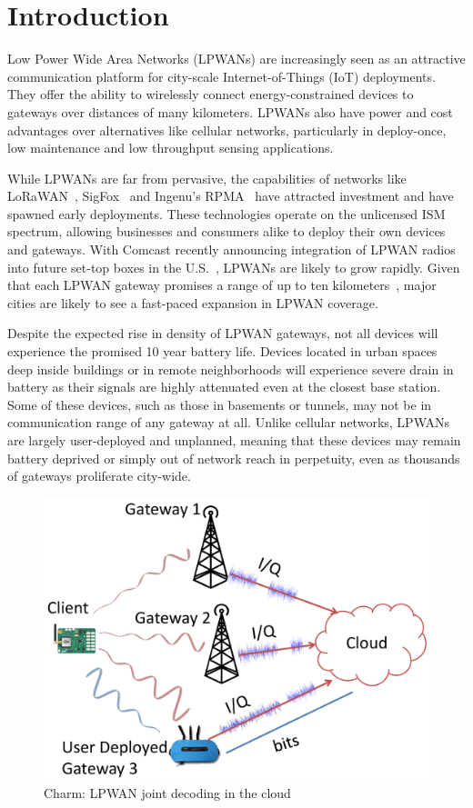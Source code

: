 
\section{Introduction}
\label{sec:intro}

Low Power Wide Area Networks (LPWANs) are increasingly seen as an attractive
communication platform for city-scale Internet-of-Things (IoT) deployments.
They offer the ability to wirelessly connect energy-constrained devices to
gateways over distances of many kilometers. LPWANs also have power and cost
advantages over alternatives like cellular networks, particularly in
deploy-once, low maintenance and low throughput sensing applications.

While LPWANs are far from pervasive, the capabilities of networks like
LoRaWAN~\cite{Sornin2015, LoRaWanAlliance2015}, SigFox~\cite{centenaro2016}
and Ingenu's RPMA~\cite{Ingenu2015} have attracted investment and have spawned
early deployments. These technologies operate on the unlicensed ISM spectrum,
allowing businesses and consumers alike to deploy their own devices and
gateways. With Comcast recently announcing integration of LPWAN radios into
future set-top boxes in the U.S.~\cite{comcast2}, LPWANs are likely
to grow rapidly. Given that each LPWAN gateway promises a range of up to ten
kilometers~\cite{LoRaWanAlliance2015}, major cities are likely to see a
fast-paced expansion in LPWAN coverage.

Despite the expected rise in density of LPWAN gateways, not all devices will
experience the promised 10 year battery life. Devices located in urban spaces
deep inside buildings or in remote neighborhoods will experience severe drain
in battery as their signals are highly attenuated even at the closest base
station. Some of these devices, such as those in basements or tunnels, may not
be in communication range of any gateway at all. Unlike cellular networks,
LPWANs are largely user-deployed and unplanned, meaning that these devices may
remain battery deprived or simply out of network reach in perpetuity, even as
thousands of gateways proliferate city-wide.

\begin{figure}[tb]
    \centering
    \includegraphics[width=0.60\columnwidth]{figures/LoRaRAN_cropped}
    \vspace*{-10 pt}
    \caption{Charm: LPWAN joint decoding in the cloud}
    \compactimg
    \label{fig:my_label}
\end{figure}

